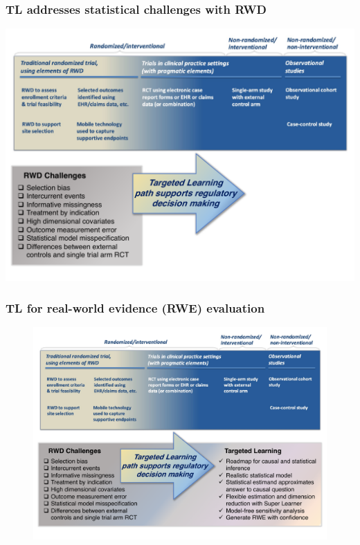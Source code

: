 \documentclass[t]{beamer}
\begin{document}
\begin{frame}
\frametitle{TL addresses statistical challenges with RWD}
\vspace{-18pt}
\begin{center}
\includegraphics[width=1.02\textwidth]{figures/TLpath1_edit.pdf}
\end{center}
\end{frame}

\begin{frame}
\frametitle{TL for real-world evidence (RWE) evaluation}
\vspace{-18pt}
\centering
\begin{figure}
\begin{center}
\includegraphics[width=1.02\textwidth]{figures/TLpath2_edit.pdf}
\end{center}
\end{figure}
\vspace{35pt}
\end{frame}
\end{document}
